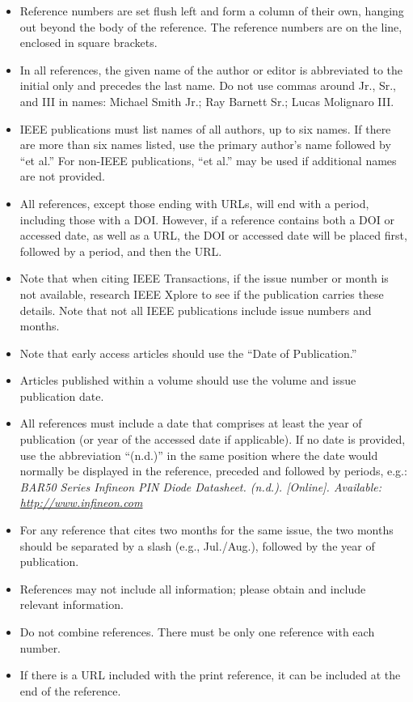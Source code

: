 \begin{itemize}
  \item Reference numbers are set flush left and form a column of their own, hanging out beyond the body of the reference. The reference numbers are on the line, enclosed in square brackets.
  \item In all references, the given name of the author or editor is abbreviated to the initial only and precedes the last name. Do not use commas around Jr., Sr., and III in names: Michael Smith Jr.; Ray Barnett Sr.; Lucas Molignaro III.
  \item IEEE publications must list names of all authors, up to six names. If there are more than six names listed, use the primary author's name followed by ``et al.'' For non-IEEE publications, ``et al.'' may be used if additional names are not provided.
  \item All references, except those ending with URLs, will end with a period, including those with a DOI. However, if a reference contains both a DOI or accessed date, as well as a URL, the DOI or accessed date will be placed first, followed by a period, and then the URL.
  \item Note that when citing IEEE Transactions, if the issue number or month is not available, research IEEE Xplore to see if the publication carries these details. Note that not all IEEE publications include issue numbers and months.
  \item Note that early access articles should use the ``Date of Publication.''
  \item Articles published within a volume should use the volume and issue publication date.
  \item All references must include a date that comprises at least the year of publication (or year of the accessed date if applicable). If no date is provided, use the abbreviation ``(n.d.)'' in the same position where the date would normally be displayed in the reference, preceded and followed by periods, e.g.:\newline
    \textit{BAR50 Series Infineon PIN Diode Datasheet. (n.d.). [Online]. Available: \url{http://www.infineon.com}}
  \item For any reference that cites two months for the same issue, the two months should be separated by a slash (e.g., Jul./Aug.), followed by the year of publication.
  \item References may not include all information; please obtain and include relevant information.
  \item Do not combine references. There must be only one reference with each number.
  \item If there is a URL included with the print reference, it can be included at the end of the reference.
\end{itemize}

